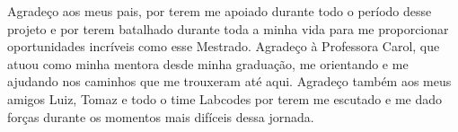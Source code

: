 \begin{agradecimentos}
    Agrade\c{c}o aos meus pais, por terem me apoiado durante todo o per\'{i}odo desse projeto e por terem batalhado durante toda a minha vida para me proporcionar oportunidades incr\'{i}veis como esse Mestrado. Agrade\c{c}o \`{a} Professora Carol, que atuou como minha mentora desde minha gradua\c{c}\~{a}o, me orientando e me ajudando nos caminhos que me trouxeram at\'{e} aqui. Agrade\c{c}o tamb\'{e}m aos meus amigos Luiz, Tomaz e todo o time Labcodes por terem me escutado e me dado for\c{c}as durante os momentos mais dif\'{i}ceis dessa jornada.
\end{agradecimentos}